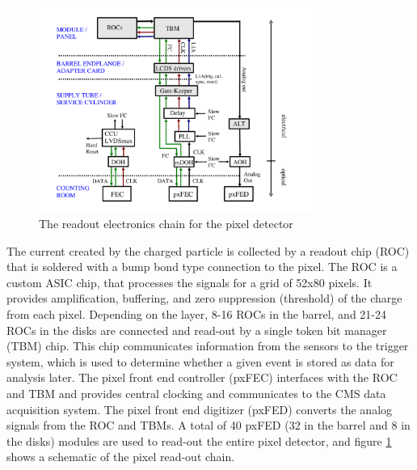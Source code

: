\begin{figure}[h]
   \centering
  \includegraphics[width=0.8\textwidth]{Figures/CMS_Diagrams/Tracker__Pixel_Readout.pdf}
  \caption{The readout electronics chain for the pixel detector} \label{fig:tracker_pixel_readout}
\end{figure}


\par The current created by the charged particle is collected by a
readout chip (ROC) that is soldered with a bump bond type connection
to the pixel.  The ROC is a custom ASIC chip, that processes the
signals for a grid of 52x80 pixels.  It provides amplification,
buffering, and zero suppression (threshold) of the charge from each
pixel.  Depending on the layer, 8-16 ROCs in the barrel, and 21-24 ROCs in
the disks are connected and read-out by a single token bit manager
(TBM) chip.  This chip communicates information from the sensors to
the trigger system, which is used to determine whether a given event
is stored as data for analysis later.  The pixel front end controller
(pxFEC) interfaces with the ROC and TBM and provides central clocking
and communicates to the CMS data acquisition system.  The pixel front
end digitizer (pxFED) converts the analog signals from the ROC and
TBMs.  A total of 40 pxFED (32 in the barrel and 8 in the disks)
modules are used to read-out the entire pixel detector, and figure
\ref{fig:tracker_pixel_readout} shows a schematic of the pixel
read-out chain. 

